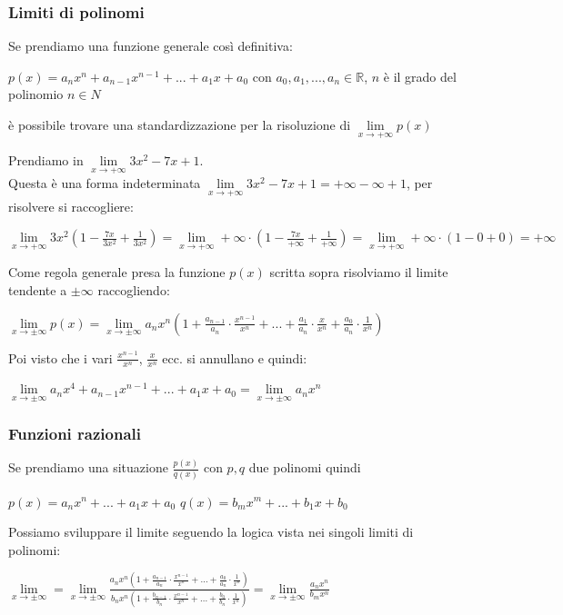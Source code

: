 \subsubsection{Limiti di polinomi}
Se prendiamo una funzione generale così definitiva:
\begin{center}
    $p(x) = a_nx^n + a_{n-1}x^{n-1} + ... + a_1x + a_0$ con $a_0, a_1, ..., a_n \in \mathbb{R}$, $n$ è il grado del polinomio $n \in N$
\end{center}
è possibile trovare una standardizzazione per la risoluzione di $\lim\limits_{x\to +\infty}p(x)$
\begin{example}
Prendiamo in $\lim\limits_{x\to +\infty}3x^2 -7x + 1$.\\
Questa è una forma indeterminata $\lim\limits_{x\to +\infty}3x^2 -7x + 1 = +\infty -\infty + 1$, per risolvere si raccogliere:
\begin{center}
    $\lim\limits_{x\to +\infty}3x^2(1 - \frac{7x}{3x^2} + \frac{1}{3x^2}) = \lim\limits_{x\to +\infty}+\infty \cdot (1 - \frac{7x}{+\infty} + \frac{1}{+\infty}) = \lim\limits_{x\to +\infty}+\infty \cdot (1 - 0 + 0) = +\infty$
\end{center}
\end{example}
\hspace{-15pt}Come regola generale presa la funzione $p(x)$ scritta sopra risolviamo il limite tendente a $\pm\infty$ raccogliendo:
\begin{center}
    \vspace{-10pt}
    $\lim\limits_{x\to \pm\infty}p(x) = \lim\limits_{x\to \pm\infty}a_nx^n (1 + \frac{a_{n-1}}{a_n} \cdot \frac{x^{n-1}}{x^n} + ... + \frac{a_{1}}{a_n} \cdot \frac{x}{x^n} + \frac{a_{0}}{a_n} \cdot \frac{1}{x^n})$
\end{center}
Poi visto che i vari $\frac{x^{n-1}}{x^n}$, $\frac{x}{x^n}$ ecc. si annullano e quindi:
\begin{center}
    $\lim\limits_{x\to \pm\infty} a_nx^4 + a_{n-1}x^{n-1} + ... + a_1x + a_0 = \lim\limits_{x\to \pm\infty}a_nx^n$
\end{center}

\subsubsection{Funzioni razionali}
Se prendiamo una situazione $\frac{p(x)}{q(x)}$ con $p,q$ due polinomi quindi
\begin{center}
    $p(x) = a_nx^n + ... + a_1x + a_0$ \hspace{1cm} $q(x) = b_mx^m + ... + b_1x + b_0$
\end{center}
Possiamo sviluppare il limite seguendo la logica vista nei singoli limiti di polinomi:
\begin{center}
    $\lim\limits_{x\to \pm\infty} = \lim\limits_{x\to \pm\infty} \frac{a_nx^n (1 + \frac{a_{n-1}}{a_n}\cdot\frac{x^{n-1}}{x^n} + ... + \frac{a_0}{a_n}\cdot\frac{1}{x^n})}{b_nx^n (1 + \frac{b_{n-1}}{b_n}\cdot\frac{x^{n-1}}{x^n} + ... + \frac{b_0}{b_n}\cdot\frac{1}{x^n})} = \lim\limits_{x\to \pm\infty}\frac{a_nx^n}{b_mx^n}$
\end{center}

